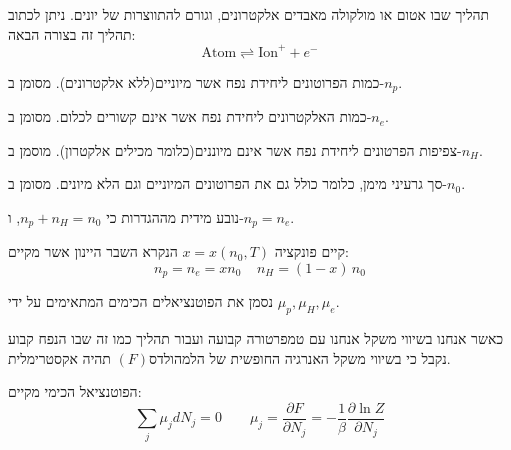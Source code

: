 \documentclass{tstextbook}
\begin{document}
\begin{definition}[יינון]
תהליך שבו אטום או מולקולה מאבדים אלקטרונים, וגורם להתווצרות של יונים. ניתן לכתוב תהליך זה בצורה הבאה:
$$\mathrm{\mathrm{Atom}}\rightleftharpoons\mathrm{\mathrm{Ion}}^{+}+e^{-}$$

\end{definition}
\begin{definition}
כמות הפרוטונים ליחידת נפח אשר מיוניים(ללא אלקטרונים). מסומן ב-\(n_{p}\).

\end{definition}
\begin{definition}
כמות האלקטרונים ליחידת נפח אשר אינם קשורים לכלום. מסומן ב-\(n_{e}\).

\end{definition}
\begin{definition}
צפיפות הפרטונים ליחידת נפח אשר אינם מיוננים(כלומר מכילים אלקטרון). מוסמן ב-\(n_{H}\).

\end{definition}
\begin{definition}
סך גרעיני מימן, כלומר כולל גם את הפרוטונים המיוניים וגם הלא מיונים. מסומן ב-\(n_{0}\).

\end{definition}
\begin{corollary}
נובע מידית מההגדרות כי \(n_{p}+n_{H}=n_{0}\), ו-\(n_{p}=n_{e}\).

\end{corollary}
\begin{proposition}
קיים פונקציה \(x=x(n_{0},T)\) הנקרא השבר היינון אשר מקיים:
$$n_{p}=n_{e}=x n_{0}\;\;\;\;n_{H}=(1-x)\,n_{0}$$

\end{proposition}
\begin{symbolize}
נסמן את הפוטנציאלים הכימים המתאימים על ידי \(\mu_{p},\mu_{H},\mu_{e}\).

\end{symbolize}
\begin{reminder}
כאשר אנחנו בשיווי משקל אנחנו עם טמפרטורה קבועה ועבור תהליך כמו זה שבו הנפח קבוע נקבל כי בשיווי משקל האנרגיה החופשית של הלמהולדס\((F)\) תהיה אקסטרימלית. 

\end{reminder}
\begin{proposition}
הפוטנציאל הכימי מקיים:
$$\sum_{j}\mu_{j}d N_{j}=0\qquad \mu_{j}=\frac{\partial F}{\partial N_{j}}=-\frac{1}{\beta}\frac{\partial \ln Z}{\partial N_{j}}$$

\end{proposition}
\end{document}
